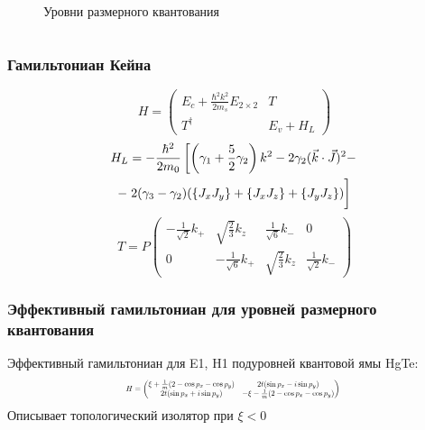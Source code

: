 \documentclass{beamer}
\begin{document}
\begin{frame}
\begin{columns}[T]
\begin{column}{0.5\textwidth}
\begin{figure}
                \caption{Уровни размерного квантования}
            \end{figure}
        \end{column}
    \end{columns}
\end{frame}

\begin{frame}
    \frametitle{Гамильтониан Кейна}
    \begin{equation}
        H = \begin{pmatrix}
                    E_c + \frac{\hbar^2 k^2}{2m_s}E_{2\times 2} & T \\
                    T^\dagger & E_v + H_{L}
            \end{pmatrix}
    \end{equation}
    \begin{multline*}
        H_L = -\frac{\hbar^2}{2m_0}\left[
                \left(\gamma_1 + \frac{5}{2}\gamma_2\right)k^2 -
                2\gamma_2(\vec{k} \cdot \vec{J})^2 - \right. \\
                - \left.2(\gamma_3 - \gamma_2)(\{J_x J_y\} + \{J_x J_z\} + \{J_y J_z\})
                \vphantom{\frac{1}{2}}\right]
    \end{multline*}
    \begin{equation*}
        T = P\begin{pmatrix}
               -\frac{1}{\sqrt{2}}k_{+} & \sqrt{\frac{2}{3}}k_z  
                        & \frac{1}{\sqrt{6}} k_{-} & 0 \\
                0 & -\frac{1}{\sqrt{6}} k_{+} 
                        & \sqrt{\frac{2}{3}}k_z & \frac{1}{\sqrt{2}} k_{-} 
             \end{pmatrix}
    \end{equation*}
\end{frame}

\begin{frame}
    \frametitle{Эффективный гамильтониан для уровней размерного квантования}
        Эффективный гамильтониан для E1, H1 подуровней квантовой ямы HgTe:
        \begin{equation}
           \label{eff_so_ham}
            \scalebox{0.6}{%
            $
            H = \left(\begin{matrix}
                    \xi + \frac{1}{m}(2 - \cos{p_x} - \cos{p_y}) & 
                            2t(\sin{p_x} - i\sin{p_y})   \\
                    2t(\sin{p_x} + i\sin{p_y}) & 
                           - \xi - \frac{1}{m}(2 - \cos{p_x} - \cos{p_y}) \\
                \end{matrix}\right)
            $
            }
        \end{equation}
        Описывает топологический изолятор при $\xi < 0$
\end{frame}
\end{document}
